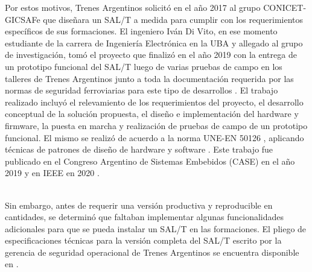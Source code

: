 Por estos motivos, Trenes Argentinos solicitó en el año 2017 al grupo CONICET-GICSAFe que diseñara un SAL/T a medida para cumplir con los requerimientos específicos de sus formaciones. El ingeniero Iván Di Vito, en ese momento estudiante de la carrera de Ingeniería Electrónica en la UBA y allegado al grupo de investigación, tomó el proyecto que finalizó en el año 2019 con la entrega de un prototipo funcional del SAL/T luego de varias pruebas de campo en los talleres de Trenes Argentinos junto a toda la documentación requerida por las normas de seguridad ferroviarias para este tipo de desarrollos \cite{salt_ivan}. El trabajo realizado incluyó el relevamiento de los requerimientos del proyecto, el desarrollo conceptual de la solución propuesta, el diseño e implementación del hardware y firmware, la puesta en marcha y realización de pruebas de campo de un prototipo funcional. El mismo se realizó de acuerdo a la norma UNE-EN 50126 \cite{norma_50126}, aplicando técnicas de patrones de diseño de hardware y software \cite{patrones}. Este trabajo fue publicado en el Congreso Argentino de Sistemas Embebidos (CASE) en el año 2019 \cite{salt_case} y en IEEE en  2020 \cite{salt_paper}. \\\



Sin embargo, antes de requerir una versión productiva y reproducible en cantidades, se determinó que faltaban implementar algunas funcionalidades adicionales para que se pueda instalar un SAL/T en las formaciones. El pliego de especificaciones técnicas para la versión completa del SAL/T escrito por la gerencia de seguridad operacional de Trenes Argentinos se encuentra disponible en \cite{spec}. \\
